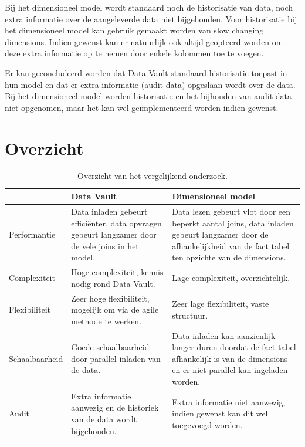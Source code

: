 Bij het dimensioneel model wordt standaard noch de historisatie van data, noch extra informatie over de aangeleverde data niet bijgehouden. Voor historisatie bij het dimensioneel model kan gebruik gemaakt worden van slow changing dimensions. Indien gewenst kan er natuurlijk ook altijd geopteerd worden om deze extra informatie op te nemen door enkele kolommen toe te voegen. 

Er kan geconcludeerd worden dat Data Vault standaard historisatie toepast in hun model en dat er extra informatie (audit data) opgeslaan wordt over de data. Bij het dimensioneel model worden historisatie en het bijhouden van audit data niet opgenomen, maar het kan wel geïmplementeerd worden indien gewenst.


\section{Overzicht}
\begin{center}
	\renewcommand{\arraystretch}{2}%
	\begin{longtable}{  l  p{}  p{} }
		\ & \textbf{Data Vault} & \textbf{Dimensioneel model} \\ \hline
		Performantie & Data inladen gebeurt efficiënter, data opvragen gebeurt langzamer door de vele joins in het model. & Data lezen gebeurt vlot door een beperkt aantal joins, data inladen gebeurt langzamer door de afhankelijkheid van de fact tabel ten opzichte van de dimensions. \\ \hline
		Complexiteit & Hoge complexiteit, kennis nodig rond Data Vault. & Lage complexiteit, overzichtelijk. \\ \hline
		Flexibiliteit & Zeer hoge flexibiliteit, mogelijk om via de agile methode te werken. & Zeer lage flexibiliteit, vaste structuur. \\ \hline
		Schaalbaarheid & Goede schaalbaarheid door parallel inladen van de data. & Data inladen kan aanzienlijk langer duren doordat de fact tabel afhankelijk is van de dimensions en er niet parallel kan ingeladen worden.  \\ \hline
		Audit & Extra informatie aanwezig en de historiek van de data wordt bijgehouden. & Extra informatie niet aanwezig, indien gewenst kan dit wel toegevoegd worden. \\
		\caption{Overzicht van het vergelijkend onderzoek.}
		\label{tab:overzicht}
	\end{longtable}
\end{center}